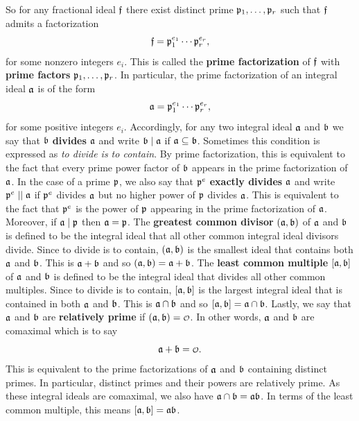     So for any fractional ideal \(\mathfrak{f}\) there exist distinct prime \(\mathfrak{p}_{1},\ldots,\mathfrak{p}_{r}\) such that \(\mathfrak{f}\) admits a factorization
    \[
      \mathfrak{f} = \mathfrak{p}_{1}^{e_{1}} \cdots \mathfrak{p}_{r}^{e_{r}},
    \]
    for some nonzero integers \(e_{i}\). This is called the \textbf{prime factorization} of \(\mathfrak{f}\) with \textbf{prime factors} \(\mathfrak{p}_{1},\ldots,\mathfrak{p}_{r}\). In particular, the prime factorization of an integral ideal \(\mathfrak{a}\) is of the form
    \[
      \mathfrak{a} = \mathfrak{p}_{1}^{e_{1}} \cdots \mathfrak{p}_{r}^{e_{r}},
    \]
    for some positive integers \(e_{i}\). Accordingly, for any two integral ideal \(\mathfrak{a}\) and \(\mathfrak{b}\) we say that \(\mathfrak{b}\) \textbf{divides} \(\mathfrak{a}\) and write \(\mathfrak{b} \mid \mathfrak{a}\) if \(\mathfrak{a} \subseteq \mathfrak{b}\). Sometimes this condition is expressed as \textit{to divide is to contain}. By prime factorization, this is equivalent to the fact that every prime power factor of \(\mathfrak{b}\) appears in the prime factorization of \(\mathfrak{a}\). In the case of a prime \(\mathfrak{p}\), we also say that \(\mathfrak{p}^{e}\) \textbf{exactly divides} \(\mathfrak{a}\) and write \(\mathfrak{p}^{e} \mid\mid \mathfrak{a}\) if \(\mathfrak{p}^{e}\) divides \(\mathfrak{a}\) but no higher power of \(\mathfrak{p}\) divides \(\mathfrak{a}\). This is equivalent to the fact that \(\mathfrak{p}^{e}\) is the power of \(\mathfrak{p}\) appearing in the prime factorization of \(\mathfrak{a}\). Moreover, if \(\mathfrak{a} \mid \mathfrak{p}\) then \(\mathfrak{a} = \mathfrak{p}\). The \textbf{greatest common divisor} \((\mathfrak{a},\mathfrak{b})\) of \(\mathfrak{a}\) and \(\mathfrak{b}\) is defined to be the integral ideal that all other common integral ideal divisors divide. Since to divide is to contain, \((\mathfrak{a},\mathfrak{b})\) is the smallest ideal that contains both \(\mathfrak{a}\) and \(\mathfrak{b}\). This is \(\mathfrak{a}+\mathfrak{b}\) and so \((\mathfrak{a},\mathfrak{b}) = \mathfrak{a}+\mathfrak{b}\). The \textbf{least common multiple} \([\mathfrak{a},\mathfrak{b}]\) of \(\mathfrak{a}\) and \(\mathfrak{b}\) is defined to be the integral ideal that divides all other common multiples. Since to divide is to contain, \([\mathfrak{a},\mathfrak{b}]\) is the largest integral ideal that is contained in both \(\mathfrak{a}\) and \(\mathfrak{b}\). This is \(\mathfrak{a} \cap \mathfrak{b}\) and so \([\mathfrak{a},\mathfrak{b}] = \mathfrak{a} \cap \mathfrak{b}\). Lastly, we say that \(\mathfrak{a}\) and \(\mathfrak{b}\) are \textbf{relatively prime} if \((\mf{a},\mf{b}) = \smc{O}\). In other words, \(\mathfrak{a}\) and \(\mathfrak{b}\) are comaximal which is to say
    \[
      \mf{a}+\mf{b} = \smc{O}.
    \]
    This is equivalent to the prime factorizations of \(\mathfrak{a}\) and \(\mathfrak{b}\) containing distinct primes. In particular, distinct primes and their powers are relatively prime. As these integral ideals are comaximal, we also have \(\mathfrak{a} \cap \mathfrak{b} = \mathfrak{a}\mathfrak{b}\). In terms of the least common multiple, this means \([\mathfrak{a},\mathfrak{b}] = \mathfrak{a}\mathfrak{b}\).
    
